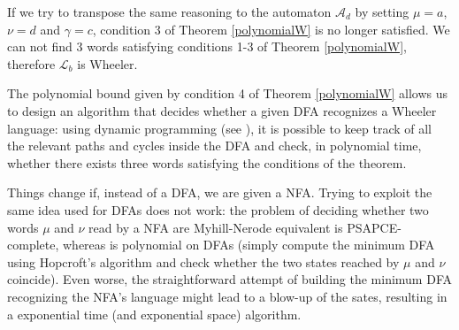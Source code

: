 \documentclass[runningheads]{llncs}
\newcommand{\pf}[1]{\text{Pref}(\mathcal #1)}
\begin{document}

If we try to transpose the same reasoning to the automaton $\mathcal A_d$ by setting $\mu = a$, $\nu = d$ and $\gamma = c$, condition 3 of Theorem \ref{polynomialW} is no longer satisfied. We can not find 3 words satisfying conditions 1-3 of Theorem \ref{polynomialW}, therefore $\mathcal L_b$ is Wheeler.

\vskip 5mm

The polynomial bound given by condition 4 of Theorem \ref{polynomialW} allows us to design an algorithm that decides whether a given DFA recognizes a Wheeler language: using dynamic programming (see \cite{ADPP}), it is possible to keep track of all the relevant paths and cycles inside the DFA and check, in polynomial time, whether there exists three words satisfying the conditions of the theorem.  

Things change if, instead of a DFA, we are given a NFA. Trying to exploit the same idea used for DFAs does not work: the problem of deciding whether two words $\mu$ and $\nu$ read by a NFA are Myhill-Nerode equivalent is PSAPCE-complete, whereas is polynomial on DFAs (simply compute the minimum DFA using Hopcroft's algorithm and check whether the two states reached by $\mu$ and $\nu$ coincide). Even worse, the straightforward attempt of building the minimum DFA recognizing the NFA's language might lead to a blow-up of the sates, resulting in a exponential time (and exponential space) algorithm. 
\end{document}
